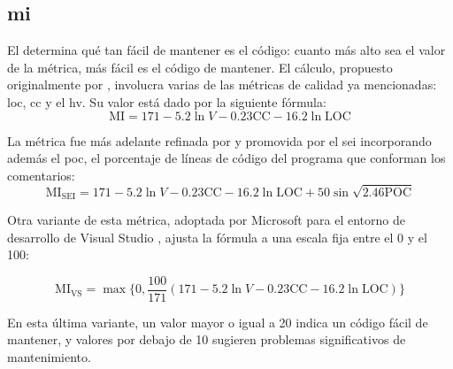 \subsection[Índice de mantenibilidad (MI, Maintainability Index)]{
   \Acrfull{mi}
}

El  determina qué tan fácil de mantener es el código: cuanto más alto sea el valor de la métrica, más fácil es el código de mantener. El cálculo, propuesto originalmente por \citet{oman1992metrics}, involucra varias de las métricas de calidad ya mencionadas: \gls{loc}, \gls{cc} y el \acrfull{hv}. Su valor está dado por la siguiente fórmula:
\[
\text{MI} = 171 - 5.2 \ln{V} - 0.23 \text{CC} - 16.2 \ln{\text{LOC}}
\]

La métrica fue más adelante refinada por \citet{coleman1994maintainability} y promovida por el \gls{sei} \citep{bray1997c4} incorporando además el \gls{poc}, el porcentaje de líneas de código del programa que conforman los comentarios:
\[
\text{MI}_\text{SEI} = 171 - 5.2 \ln{V} - 0.23 \text{CC} - 16.2 \ln{\text{LOC} + 50 \sin{\sqrt{2.46 \text{POC}}} }
\]

Otra variante de esta métrica, adoptada por Microsoft para el entorno de desarrollo de Visual Studio \citep{microsoft2025mi}, ajusta la fórmula a una escala fija entre el 0 y el 100:

\[
\text{MI}_\text{VS} = \max \{ 0, \frac{100}{171} (171 - 5.2 \ln{V} - 0.23 \text{CC} - 16.2 \ln{\text{LOC}}) \}
\]

En esta última variante, un valor mayor o igual a 20 indica un código fácil de mantener, y valores por debajo de 10 sugieren problemas significativos de mantenimiento.
